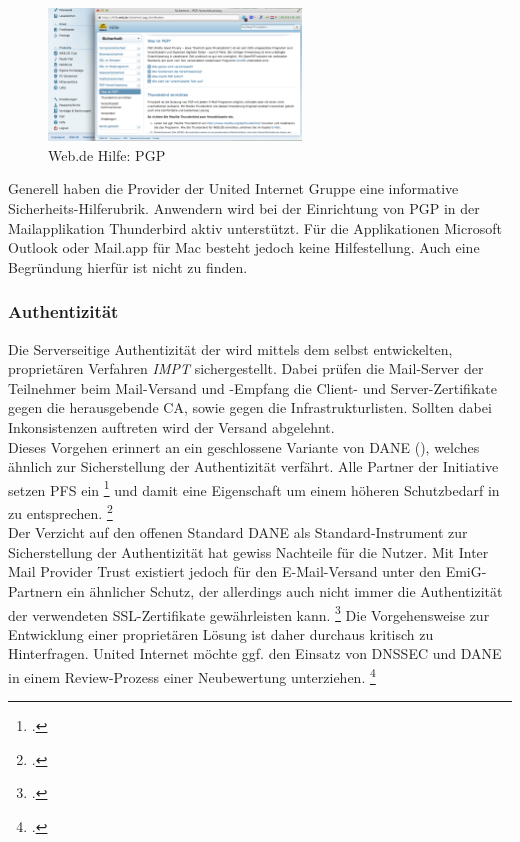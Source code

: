 \documentclass  [paper=a4,
				fontsize=12pt,
				listof=totoc,
				bibliography=totoc
				]{scrreprt}
\begin{document}
			\begin{figure} %
				\vspace{-12pt}
				\centering
				\includegraphics[width=0.6\textwidth]{images/Web-de_Hilfe_PGP}
				\caption[Web.de PGP]{Web.de Hilfe: PGP} 
				\label{fig:Web-de_Hilfe_PGP} %
				\vspace{-24pt}
			\end{figure}
			Generell haben die Provider der United Internet Gruppe eine informative Sicherheits-Hilferubrik.
			Anwendern wird bei der Einrichtung von PGP in der Mailapplikation Thunderbird aktiv unterstützt.
			Für die Applikationen Microsoft Outlook oder Mail.app für Mac besteht jedoch keine Hilfestellung.
			Auch eine Begründung hierfür ist nicht zu finden.
		\subsubsection{Authentizität}
		\label{subsubsec:emig-auth}	
			Die Serverseitige Authentizität der wird mittels dem selbst entwickelten, proprietären Verfahren \textit{\ac{IMPT}} sichergestellt. 
			Dabei prüfen die Mail-Server der Teilnehmer beim Mail-Versand und -Empfang die Client- und Server-Zertifikate gegen die herausgebende CA, sowie gegen die Infrastrukturlisten.
			Sollten dabei Inkonsistenzen auftreten wird der Versand abgelehnt.\\
			Dieses Vorgehen erinnert an ein geschlossene Variante von \ac{DANE} (), welches ähnlich zur Sicherstellung der Authentizität verfährt.
			Alle Partner der Initiative setzen \ac{PFS} ein
			\footcite[Vgl.][]{Zivadino14-1}
			und damit eine Eigenschaft um einem höheren Schutzbedarf in zu entsprechen.
			\footcite[Vgl.][]{Zivadino14-2} 
			\medskip\\
			Der Verzicht auf den offenen Standard DANE als Standard-Instrument zur Sicherstellung der Authentizität hat gewiss Nachteile für die Nutzer. 
			Mit Inter Mail Provider Trust existiert jedoch für den E-Mail-Versand unter den EmiG-Partnern ein ähnlicher Schutz, der allerdings auch nicht immer die Authentizität der verwendeten SSL-Zertifikate gewährleisten kann.
			\footcite[Vgl.][]{Zivadino14-1}
			Die Vorgehensweise zur Entwicklung einer proprietären Lösung ist daher durchaus kritisch zu Hinterfragen. 
			United Internet möchte ggf. den Einsatz von DNSSEC und DANE in einem Review-Prozess einer Neubewertung unterziehen.
			\footcite[Vgl.][]{Zivadino14-2}
\end{document}

